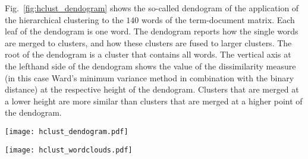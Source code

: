 Fig.~\ref{fig:hclust_dendogram} shows the so-called dendogram of the application of the hierarchical clustering to the $140$ words of the term-document matrix. Each leaf of the dendogram is one word. The dendogram reports how the single words are merged to clusters, and how these clusters are fused to larger clusters. The root of the dendogram is a cluster that contains all words. The vertical axis at the lefthand side of the dendogram shows the value of the dissimilarity measure (in this case Ward's minimum variance method in combination with the binary distance) at the respective height of the dendogram. Clusters that are merged at a lower height are more similar than clusters that are merged at a higher point of the dendogram. 

\begin{sidewaysfigure}
    \centering
    \texttt{[image: hclust\_dendogram.pdf]}
    \caption{Dendogram for the application of hierarchical clustering on the $140$ words of the term-document matrix of Elon Musk's Tweets. The vertical axis shows the value of the dissimilarity measure (in this case Ward's minimum variance method in combination with the binary distance) at the respective height. The red boxes and colorization of the different parts of the dendogram show the word categorization for $15$ clusters. A visualization of the words in the $15$ clusters is given in Fig.~\ref{fig:hclust_wordclouds}.}
    \label{fig:hclust_dendogram}
\end{sidewaysfigure}

\begin{sidewaysfigure}
    \centering
    \texttt{[image: hclust\_wordclouds.pdf]}
    \caption{Wordclouds of the $15$ clusters obtained from the application of hierarchical clustering in Fig.~\ref{fig:hclust_dendogram}. An interpretation of the clusters can be found in the main text.}
    \label{fig:hclust_wordclouds}
\end{sidewaysfigure}
